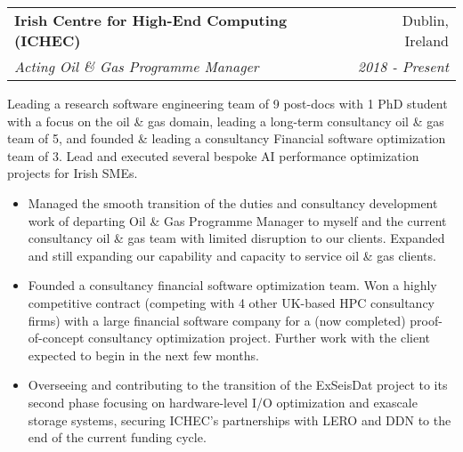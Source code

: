 \documentclass[11pt]{article}
\makeatletter
\newcommand{\resumeSection}[1]{
    \par
    \large {\sc {#1}}
    \par
    \vspace{-0.9\baselineskip}
    \hrulefill
    \vspace{0.25\baselineskip}
    \par
}
\newenvironment{resumeSubSectionHeader}{
    \par
    \begin{tabular*}{\textwidth}{l@{\extracolsep{\fill}}r}
    \par
} {
    \end{tabular*}
    \par
}
\newenvironment{resumeSubSectionBody}{
    \par
    \vspace{-0.2\parskip}
    \begin{small}
    \par
} {
    \par
    \end{small}
    \par
}
\newenvironment{resumeItemize}{
    \vspace{-0.5\baselineskip}
    \begin{itemize}
} {
    \end{itemize}
}
\makeatother
\begin{document}


\resumeSection{Experience}


%
%

\begin{resumeSubSectionHeader}

    \textbf{Irish Centre for High-End Computing (ICHEC)} & Dublin, Ireland \\
    \emph{Acting Oil \& Gas Programme Manager} & \emph{2018 - Present}

\end{resumeSubSectionHeader}
\begin{resumeSubSectionBody}

    Leading a research software engineering team of 9 post-docs with 1 PhD
    student with a focus on the oil \& gas domain,
    leading a long-term consultancy oil \& gas team of 5,
    and founded \& leading a consultancy Financial software optimization team of
    3.
    Lead and executed several bespoke AI performance optimization projects for
    Irish SMEs.

    \begin{resumeItemize}
        \item
            Managed the smooth transition of the duties and consultancy
            development work of departing Oil \& Gas Programme Manager to myself
            and the current consultancy oil \& gas team with limited disruption
            to our clients. Expanded and still expanding our capability and
            capacity to service oil \& gas clients.

        \item
            Founded a consultancy financial software optimization team. Won a
            highly competitive contract (competing with 4 other UK-based HPC
            consultancy firms) with a large financial software company for a
            (now completed) proof-of-concept consultancy optimization project.
            Further work with the client expected to begin in the next few
            months.

        \item
            Overseeing and contributing to the transition of the ExSeisDat
            project to its second phase focusing on hardware-level I/O
            optimization and exascale storage systems, securing ICHEC's
            partnerships with LERO and DDN to the end of the current funding
            cycle.


\end{resumeItemize}
\end{resumeSubSectionBody}
\end{document}

